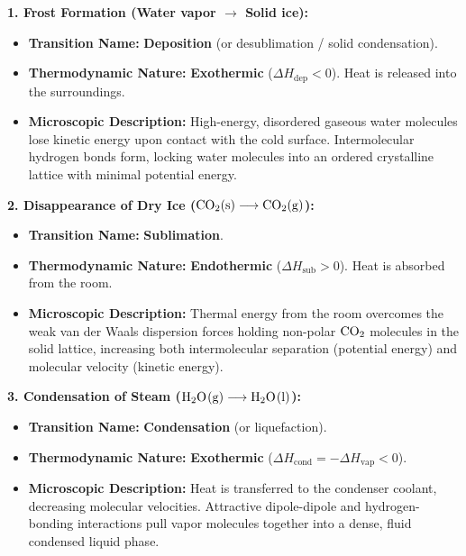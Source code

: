 \begin{solution}
\textbf{1. Frost Formation (Water vapor $\longrightarrow$ Solid ice):}
\begin{itemize}[leftmargin=1.5em,itemsep=2pt]
  \item \textbf{Transition Name:} \textbf{Deposition} (or desublimation / solid condensation).
  \item \textbf{Thermodynamic Nature:} \textbf{Exothermic} ($\Delta H_{\text{dep}} < 0$). Heat is released into the surroundings.
  \item \textbf{Microscopic Description:} High-energy, disordered gaseous water molecules lose kinetic energy upon contact with the cold surface. Intermolecular hydrogen bonds form, locking water molecules into an ordered crystalline lattice with minimal potential energy.
\end{itemize}

\textbf{2. Disappearance of Dry Ice ($\ce{CO2(s)} \longrightarrow \ce{CO2(g)}$):}
\begin{itemize}[leftmargin=1.5em,itemsep=2pt]
  \item \textbf{Transition Name:} \textbf{Sublimation}.
  \item \textbf{Thermodynamic Nature:} \textbf{Endothermic} ($\Delta H_{\text{sub}} > 0$). Heat is absorbed from the room.
  \item \textbf{Microscopic Description:} Thermal energy from the room overcomes the weak van der Waals dispersion forces holding non-polar $\ce{CO2}$ molecules in the solid lattice, increasing both intermolecular separation (potential energy) and molecular velocity (kinetic energy).
\end{itemize}

\textbf{3. Condensation of Steam ($\ce{H2O(g)} \longrightarrow \ce{H2O(l)}$):}
\begin{itemize}[leftmargin=1.5em,itemsep=2pt]
  \item \textbf{Transition Name:} \textbf{Condensation} (or liquefaction).
  \item \textbf{Thermodynamic Nature:} \textbf{Exothermic} ($\Delta H_{\text{cond}} = -\Delta H_{\text{vap}} < 0$).
  \item \textbf{Microscopic Description:} Heat is transferred to the condenser coolant, decreasing molecular velocities. Attractive dipole-dipole and hydrogen-bonding interactions pull vapor molecules together into a dense, fluid condensed liquid phase.
\end{itemize}
\end{solution}

